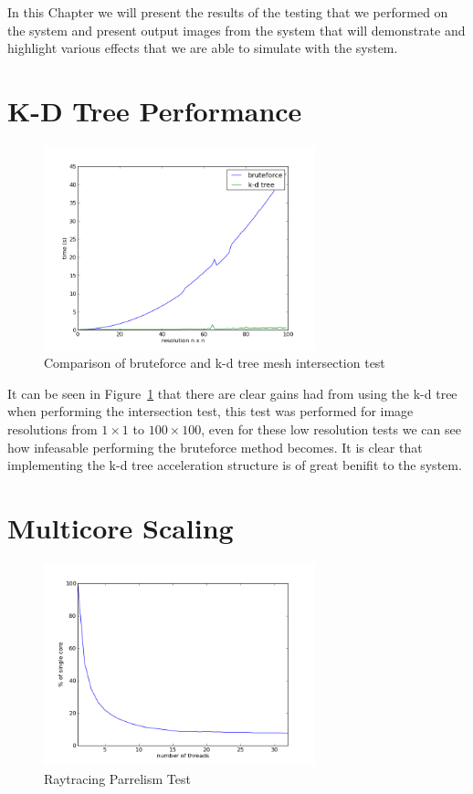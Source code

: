 In this Chapter we will present the results of the testing that we performed on the system and
present output images from the system that will demonstrate and highlight various effects that
we are able to simulate with the system.

\section{K-D Tree Performance}
\begin{figure}[h]
\centering
\includegraphics[width=0.7\textwidth]{images/results/tri_intersection.png}
\caption{Comparison of bruteforce and k-d tree mesh intersection test}
\label{fig:bf_kd_comp}
\end{figure}
It can be seen in Figure~\ref{fig:bf_kd_comp} that there are clear gains had from 
using the k-d tree when performing the intersection test, this test was performed
for image resolutions from $1\times1$ to $100\times100$, even for these low
resolution tests we can see how infeasable performing the bruteforce method becomes.
It is clear that implementing the k-d tree acceleration structure is of great
benifit to the system.


\section{Multicore Scaling}
\begin{figure}[h]
\centering
\includegraphics[width=0.7\textwidth]{./images/results/raytrace_multicore.png}
\caption{Raytracing Parrelism Test}
\label{fig:perfraytrace}
\end{figure}

